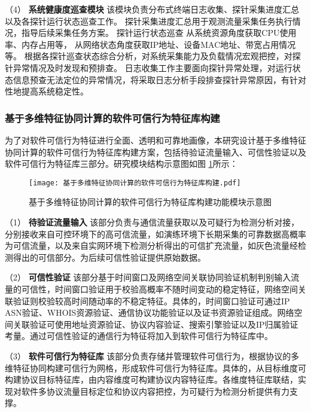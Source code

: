 （4） \textbf{系统健康度巡查模块}\quad
该模块负责分布式终端日志收集、探针采集进度汇总以及各探针运行状态巡查工作。
探针采集进度汇总用于观测流量采集任务执行情况，指导后续采集任务方案。
探针运行状态巡查
从系统资源角度获取CPU使用率、内存占用等，
从网络状态角度获取IP地址、设备MAC地址、带宽占用情况等。
根据各探针巡查状态综合分析，对系统采集能力及负载情况宏观把控，对探针异常情况及时发现和预排查。
日志收集工作主要面向探针异常处理，对运行状态信息预查无法定位的异常情况，将采取日志分析手段排查探针异常原因，有针对性地提高系统稳定性。

\subsubsection{基于多维特征协同计算的软件可信行为特征库构建}

为了对软件可信行为特征进行全面、透明和可靠地画像，本研究设计基于多维特征协同计算的软件可信行为特征库构建方案，包括待验证流量输入、可信性验证以及软件可信行为特征库三部分。研究模块结构示意图如图 \ref{fig:基于多维特征协同计算的软件可信行为特征库构建}所示：

\FloatBarrier
 
\begin{figure}[ht]
  \centering
  \texttt{[image: 基于多维特征协同计算的软件可信行为特征库构建.pdf]}
  \caption{基于多维特征协同计算的软件可信行为特征库构建功能模块示意图}
  \label{fig:基于多维特征协同计算的软件可信行为特征库构建}
\end{figure} 

\FloatBarrier


（1） \textbf{待验证流量输入}\quad
该部分负责与通信流量获取以及可疑行为检测分析对接，分别接收来自可控环境下的高可信流量，如演练环境下长期采集的可靠数据高概率为可信流量，以及来自实网环境下检测分析得出的可信扩充流量，如灰色流量经检测得出的可信部分。为后续可信性验证提供原始数据。

（2） \textbf{可信性验证}\quad
该部分基于时间窗口及网络空间关联协同验证机制判别输入流量的可信性，时间窗口验证用于校验高概率不随时间变动的稳定特征，网络空间关联验证则校验较高时间随动率的不稳定特征。具体的，时间窗口验证可通过IP ASN验证、WHOIS资源验证、通信协议功能验证以及证书资源验证组成。网络空间关联验证可使用地址资源验证、协议内容验证、搜索引擎验证以及IP归属验证考量。通过可信性验证的通信行为特征将加入到软件可信行为特征库中。

（3） \textbf{软件可信行为特征库}\quad
该部分负责存储并管理软件可信行为，根据协议的多维特征协同构建可信行为网格，形成软件可信行为特征库。具体的，从目标维度可构建协议目标特征库，由内容维度可构建协议内容特征库。各维度特征库联结，实现对软件多协议流量目标定位和协议内容把控，为可疑行为检测分析提供有力支撑。 
 
